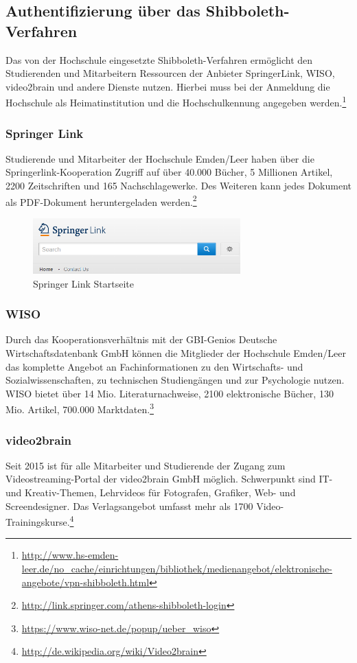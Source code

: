 \subsection{Authentifizierung über das Shibboleth-Verfahren}
Das von der Hochschule eingesetzte Shibboleth-Verfahren ermöglicht den Studierenden und Mitarbeitern Ressourcen der Anbieter SpringerLink, WISO, video2brain und andere Dienste nutzen. Hierbei muss  bei der Anmeldung die Hochschule als Heimatinstitution und die Hochschulkennung angegeben werden.\footnote{\url{http://www.hs-emden-leer.de/no_cache/einrichtungen/bibliothek/medienangebot/elektronische-angebote/vpn-shibboleth.html}}

\subsubsection{Springer Link}
Studierende und Mitarbeiter der Hochschule Emden/Leer haben über die Springerlink-Kooperation Zugriff auf über 40.000 Bücher, 5 Millionen Artikel, 2200 Zeitschriften und 165 Nachschlagewerke. Des Weiteren kann jedes Dokument als PDF-Dokument heruntergeladen werden.\footnote{\url{http://link.springer.com/athens-shibboleth-login}}

\begin{figure}[h!]
	\centering
	\includegraphics[width=8cm]{kapitel/gruppe2/bilder/springerlink_startseite}
	\caption{Springer Link Startseite}
	\label{fig_springerlink_startseite}
\end{figure}

\subsubsection{WISO}
Durch das Kooperationsverhältnis mit der GBI-Genios Deutsche Wirtschaftsdatenbank GmbH können die Mitglieder der Hochschule Emden/Leer das komplette Angebot an Fachinformationen zu den Wirtschafts- und Sozialwissenschaften, zu technischen Studiengängen und zur Psychologie  nutzen. WISO bietet über 14 Mio. Literaturnachweise, 2100 elektronische Bücher, 130 Mio. Artikel, 700.000 Marktdaten.\footnote{\url{https://www.wiso-net.de/popup/ueber_wiso}}

\subsubsection{video2brain}
Seit 2015 ist für alle Mitarbeiter und Studierende der Zugang zum Videostreaming-Portal der video2brain GmbH möglich. Schwerpunkt sind IT- und Kreativ-Themen, Lehrvideos für Fotografen, Grafiker, Web- und Screendesigner. Das Verlagsangebot umfasst mehr als 1700 Video-Trainingskurse.\footnote{\url{http://de.wikipedia.org/wiki/Video2brain}}

